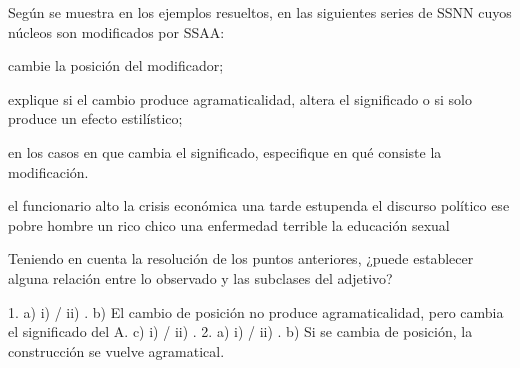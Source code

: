 \begin{ejercicio}\label{ej:05-posicion}
Según se muestra en los ejemplos resueltos, en las siguientes series de SSNN
cuyos núcleos son modificados por SSAA:

\begin{consignas}
  \item cambie la posición del modificador;
  \item explique si el cambio produce agramaticalidad, altera el significado o
        si solo produce un efecto estilístico;
  \item en los casos en que cambia el significado, especifique en qué consiste
        la modificación.
\end{consignas}

\begin{exe}
  \ex el funcionario alto
  \ex la crisis económica
  \ex una tarde estupenda
  \ex el discurso político
  \ex ese pobre hombre
  \ex un rico chico
  \ex una enfermedad terrible
  \ex la educación sexual
\end{exe}

\begin{consignas}[resume]
  \item Teniendo en cuenta la resolución de los puntos anteriores, ¿puede
        establecer alguna relación entre lo observado y las subclases del
        adjetivo?
\end{consignas}

\begin{resuelto}
1. a) i)  / ii) . b) El
cambio de posición no produce agramaticalidad, pero cambia el significado del A.
c) i)  / ii) . 2. a) i)  / ii) . b) Si se cambia de
posición, la construcción se vuelve agramatical.
\end{resuelto}
\end{ejercicio}

